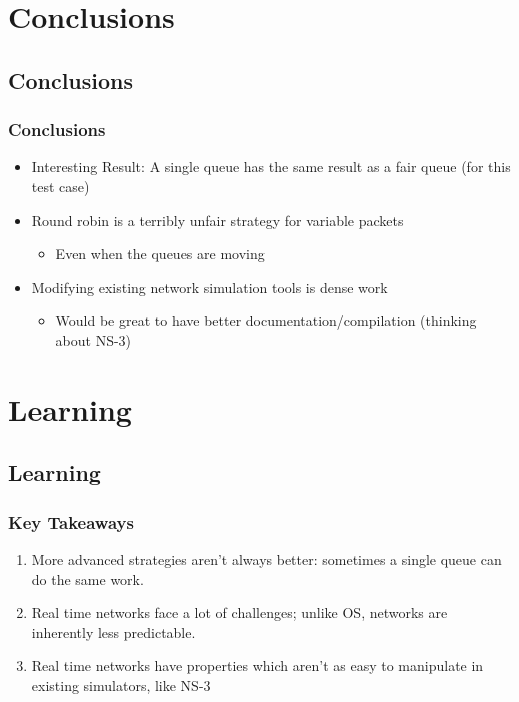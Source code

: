 \documentclass[compress]{beamer}
\begin{document}
    \section{Conclusions}
    \subsection{Conclusions}
    \begin{frame}
        \frametitle{Conclusions}
        \begin{itemize}
            \item \alert{Interesting Result:} A single queue has the same result as a fair queue (for this test case)
            \item Round robin is a terribly unfair strategy for variable packets
            \begin{itemize}
                \item Even when the queues are moving
            \end{itemize}
            \item Modifying existing network simulation tools is dense work
            \begin{itemize}
                \item Would be great to have better documentation/compilation (thinking about NS-3)
            \end{itemize}
        \end{itemize}
    \end{frame}


    \section{Learning}

    \subsection{Learning}
    \begin{frame}
        \frametitle{Key Takeaways}
        \begin{enumerate}
            \item More advanced strategies aren't always better: sometimes a single queue can do the same work.
            \item Real time networks face a lot of challenges; unlike OS, networks are inherently less predictable.
            \item Real time networks have properties which aren't as easy to manipulate in existing simulators, like NS-3
        \end{enumerate}
    \end{frame}
\end{document}
